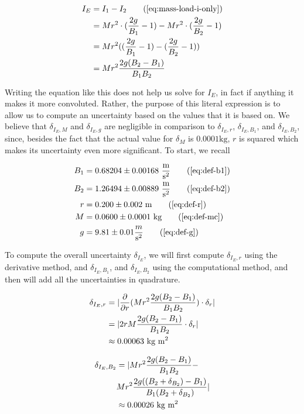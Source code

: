 \documentclass[coverpage]{article}
\newcommand{\iUnit}{\text{kg $\text{m}^2$}}
\newcommand{\mpssq}{\frac{\text{m}}{\text{s}^2}}
\begin{document}
	\begin{align}
		I_E &= I_1 - I_2 \tag{\ref{eq:mass-load-i-only}} \\
		&= M r^2 \cdot (\frac{2g}{B_1} - 1) - Mr^2 \cdot (\frac{2g}{B_2} - 1) \notag \\
		&= M r^2 ((\frac{2g}{B_1} - 1) - (\frac{2g}{B_2} - 1)) \notag \\
		&= M r^2 \frac{2g(B_2 - B_1)}{B_1 B_2}
	\end{align}

	Writing the equation like this does not help us solve for $I_E$, in fact if anything it makes it more convoluted. Rather, the purpose of this literal expression is to allow us to compute an uncertainty based on the values that it is based on. We believe that $\delta_{I_E, M}$ and $\delta_{I_E, g}$ are negligible in comparison to $\delta_{I_E, r}$, $\delta_{I_E, B_1}$, and $\delta_{I_E, B_2}$, since, besides the fact that the actual value for $\delta_M$ is $0.0001 \text{kg}$, $r$ is squared which makes its uncertainty even more significant. To start, we recall
	
	\begin{align}
		B_1 &= 0.68204 \pm 0.00168\ \mpssq \tag{\ref{eq:def-b1}} \\
		B_2 &= 1.26494 \pm 0.00889\ \mpssq \tag{\ref{eq:def-b2}} \\
		r &= 0.200 \pm 0.002\ \text{m} \tag{\ref{eq:def-r}} \\
		M &= 0.0600 \pm 0.0001\ \text{kg} \tag{\ref{eq:def-mc}} \notag \\
		g &= 9.81 \pm 0.01 \frac{m}{\text{s}^2} \tag{\ref{eq:def-g}}
	\end{align}
	
	To compute the overall uncertainty $\delta_{I_E}$, we will first compute $\delta_{I_E, r}$ using the derivative method, and $\delta_{I_E, B_1}$, and $\delta_{I_E, B_2}$ using the computational method, and then will add all the uncertainties in quadrature.
	
	\begin{align}
		\delta_{I_E, r} &= |\frac{\partial}{\partial r}(M r^2 \frac{2g(B_2 - B_1)}{B_1 B_2}) \cdot \delta_r| \notag \\
		&= |2r M \frac{2g(B_2 - B_1)}{B_1 B_2} \cdot \delta_r| \notag \\
		&\approx 0.00063\ \iUnit
	\end{align}

	\begin{align}
		\delta_{I_E, B_2} &= |M r^2 \frac{2g(B_2 - B_1)}{B_1 B_2} - \notag \\
		&M r^2 \frac{2g((B_2 + \delta_{B_2}) - B_1)}{B_1 (B_2 + \delta_{B_2})}| \notag \\
		&\approx 0.00026\ \iUnit
	\end{align}
\end{document}
